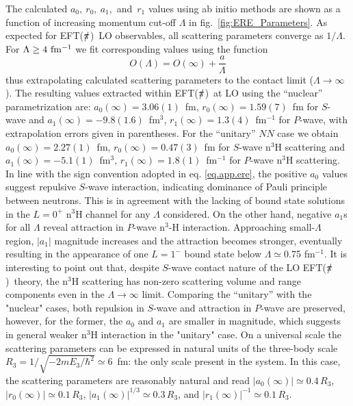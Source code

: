 \documentclass[5p,times]{elsarticle}
\newcommand{\eftnopi}{\mbox{EFT($\slashed{\pi}$) }}
\begin{document}
The calculated $a_0,~r_0,~a_1$,~and~$r_1$ values using ab initio methods are shown as a function of increasing momentum cut-off $\Lambda$ in fig.~\ref{fig:ERE_Parameters}. 
As expected for \eftnopi LO observables, all scattering parameters converge as $1/\Lambda$. For $\Lambda \geq 4~{\rm fm^{-1}}$ we fit corresponding values using the function
\begin{equation}
    O(\Lambda) = O(\infty) +\frac{a}{\Lambda}
    \label{extrapolation}
\end{equation}
thus extrapolating calculated scattering parameters to the contact limit ($\Lambda \rightarrow \infty$). 
The resulting values extracted within \eftnopi at LO using the ``nuclear'' parametrization are: $a_0(\infty) = 3.06(1)$~fm, $r_0(\infty) = 1.59(7)$~fm for $S$-wave and $a_1(\infty) = -9.8(1.6)$~fm$^3$, $r_1(\infty) = 1.3(4)$~fm$^{-1}$ for $P$-wave, with extrapolation errors given in parentheses.
For the ``unitary'' $NN$ case we obtain $a_0(\infty) = 2.27(1)$~fm, $r_0(\infty) = 0.47(3)$~fm for $S$-wave n$^3$H scattering and $a_1(\infty) = -5.1(1)$~fm$^3$, $r_1(\infty) = 1.8(1)$~fm$^{-1}$ for $P$-wave n$^3$H scattering. 
%
In line with the sign convention adopted in eq. \ref{eq.app.ere}, the positive $a_0$ values suggest repulsive $S$-wave interaction, indicating dominance of Pauli principle between neutrons. 
This is in agreement with the lacking of bound state solutions in the $L=0^+$ n$^3$H channel for any $\Lambda$ considered. On the other hand, negative $a_1$s for all $\Lambda$ reveal attraction in $P$-wave n$^3$-H interaction. Approaching small-$\Lambda$ region, $|a_1|$ magnitude increases and the attraction becomes stronger, eventually resulting in the appearance of one $L=1^-$ bound state below $\Lambda\simeq$0.75 fm$^{-1}$. 
It is interesting to point out that, despite $S$-wave contact nature of the LO \eftnopi theory, the n$^3$H scattering has non-zero scattering volume and range components even in the $\Lambda \rightarrow \infty$ limit.
%
Comparing the ``unitary'' with the "nuclear" cases, both repulsion in $S$-wave and attraction in $P$-wave are preserved, however, for the former, the $a_0$ and $a_1$ are smaller in magnitude, which suggests in general weaker n$ ^3$H interaction in the "unitary" case.
%
On a universal scale the scattering parameters can be expressed in
natural units of the three-body scale $R_3=1/\sqrt{-2mE_3/\hbar^2}\simeq 6$~fm: the only scale present in the system. 
In this case, the scattering parameters are reasonably natural and read $|a_0(\infty)|\simeq0.4\,R_3$, $|r_0(\infty)| \simeq 0.1\,R_3$, $|a_1(\infty)|^{1/3} \simeq 0.3\,R_3$, and $|r_1(\infty)|^{-1} \simeq 0.1\,R_3$. %
%
\end{document}
